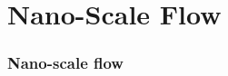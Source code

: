 \section{Nano-Scale Flow}
\label{sec:nano}

\begin{frame}
    \frametitle{Nano-scale flow}
    

\end{frame}